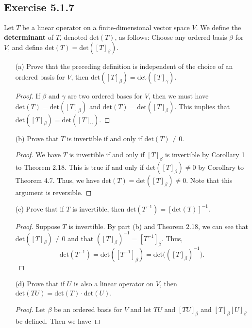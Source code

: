 \subsection*{Exercise 5.1.7} Let \( T  \) be a linear operator on a finite-dimensional vector space \( V  \). We define the \textbf{determinant} of \( T  \), denoted \( \text{det}(T) \), as follows: Choose any ordered basis \( \beta  \) for \( V  \), and define \( \text{det}(T) = \text{det}([T]_{\beta}) \).
\begin{enumerate}
    \item[(a)] Prove that the preceding definition is independent of the choice of an ordered basis for \( V  \), then \( \text{det}([T]_{\beta}) = \text{det}([T]_{\gamma}) \).
        \begin{proof}
        If \( \beta  \) and \( \gamma \) are two ordered bases for \( V  \), then we must have \( \text{det}(T) = \text{det}([T]_{\beta}) \) and \( \text{det}(T) = \text{det}([T]_{\beta}) \). This implies that \( \text{det}([T]_{\beta}) = \text{det}([T]_{\gamma}) \).
        \end{proof}
    \item[(b)] Prove that \( T  \) is invertible if and only if \( \text{det}(T) \neq 0  \).
        \begin{proof}
        We have \( T  \) is invertible if and only if \( [T]_{\beta} \) is invertible by Corollary 1 to Theorem 2.18. This is true if and only if \( \text{det}([T]_{\beta}) \neq 0  \) by Corollary to Theorem 4.7. Thus, we have \( \text{det}(T) = \text{det}([T]_{\beta}) \neq 0  \). Note that this argument is reversible. 
        \end{proof}
    \item[(c)] Prove that if \( T  \) is invertible, then \( \text{det}(T^{-1}) = [\text{det}(T)]^{-1}.\)
        \begin{proof}
        Suppose \( T  \) is invertible. By part (b) and Theorem 2.18, we can see that \( \text{det}([T]_{\beta}) \neq  0  \) and that \( ([T]_{\beta})^{-1} = [T^{-1}]_{\beta} \). Thus,  
        \[  \text{det}(T^{-1}) = \text{det}([T^{-1}]_{\beta}) = \text{det} \Big(  ([T]_{\beta})^{-1} \Big). \]
        \end{proof}
    \item[(d)] Prove that if \( U  \) is also a linear operator on \( V  \), then \( \text{det}(TU) = \text{det}(T) \cdot \text{det}(U) \).
        \begin{proof}
        Let \( \beta  \) be an ordered basis for \( V  \) and let \( TU  \) and \( [TU]_{\beta} \) and \( [T]_{\beta} [U]_{\beta}  \) be defined. Then we have

\end{proof}
\end{enumerate}
